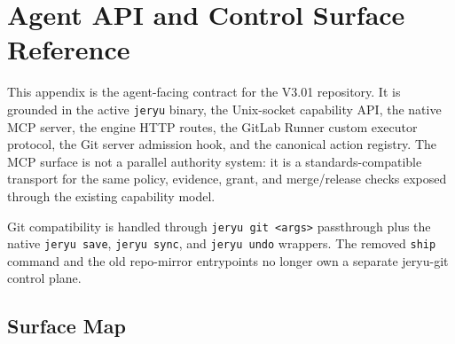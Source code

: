 \clearpage
\onecolumn
\raggedbottom
\section{Agent API and Control Surface Reference}
\label{app:agent-api}

\newcommand{\apicmd}[1]{\texttt{\footnotesize #1}}
\newcommand{\apicode}[1]{\texttt{\footnotesize #1}}
\newcommand{\apitabletitle}[1]{\par\medskip\begin{center}\small\textsc{#1}\end{center}\vspace{-0.7em}}
\setlength{\tabcolsep}{3pt}
\renewcommand{\arraystretch}{1.12}

This appendix is the agent-facing contract for the V3.01 repository. It is grounded in the active \apicode{jeryu} binary, the Unix-socket capability API, the native MCP server, the engine HTTP routes, the GitLab Runner custom executor protocol, the Git server admission hook, and the canonical action registry. The MCP surface is not a parallel authority system: it is a standards-compatible transport for the same policy, evidence, grant, and merge/release checks exposed through the existing capability model.

Git compatibility is handled through \apicode{jeryu git <args>} passthrough plus the native \apicode{jeryu save}, \apicode{jeryu sync}, and \apicode{jeryu undo} wrappers. The removed \apicode{ship} command and the old repo-mirror entrypoints no longer own a separate jeryu-git control plane.

\subsection{Surface Map}

